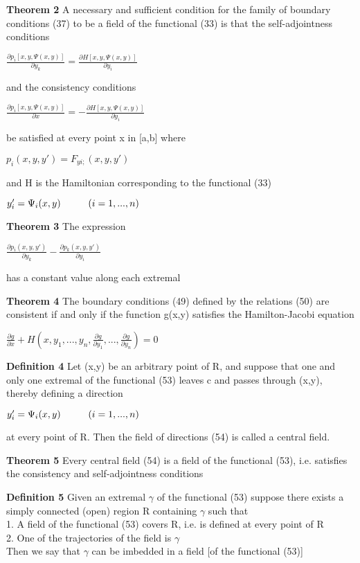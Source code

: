 \documentclass{article}
\newcommand\tab[1][1cm]{\hspace*{#1}}
\begin{document}
\textbf {Theorem 2} A necessary and sufficient condition for the family of boundary conditions (37) to be a field of the functional (33) is that the self-adjointness conditions
\begin{center}
$\frac{\partial p_i [x,y, \Psi(x,y)]}{\partial y_k} = \frac{\partial H[x,y, \Psi(x,y)]}{\partial y_i}$
\end{center}
and the consistency conditions
\begin{center}
$\frac{\partial p_i [x,y, \Psi(x,y)]}{\partial x} = - \frac{\partial H [x,y,\Psi(x,y)]}{\partial y_i}$
\end{center}
be satisfied at every point x in [a,b] where
\begin{center}
$p_i(x,y,y') = F_{yi;}(x,y,y')$
\end{center}
and H is the Hamiltonian corresponding to the functional (33)
\begin{center}
$y'_i = \Psi_i(x,y) \tab (i = 1,...,n)$
\end{center}

\textbf {Theorem 3} The expression 
\begin{center}
$\frac{\partial p_i(x,y,y')}{\partial y_k} - \frac{\partial p_k (x,y,y')}{\partial y_i}$
\end{center}
has a constant value along each extremal

\textbf {Theorem 4} The boundary conditions (49) defined by the relations (50) are consistent if and only if the function g(x,y) satisfies the Hamilton-Jacobi equation
\begin{center}
$\frac{\partial g}{\partial x} + H( x, y_1 ,..., y_n, \frac{\partial g}{\partial y_1} ,..., \frac{\partial g}{\partial y_n} ) = 0$
\end{center}

\textbf {Definition 4} Let (x,y) be an arbitrary point of R, and suppose that one and only one extremal of the functional (53) leaves c and passes through (x,y), thereby defining a direction
\begin{center}
$y'_i = \Psi_i(x,y) \tab (i = 1,...,n)$
\end{center}
at every point of R. Then the field of directions (54) is called a central field.

\textbf {Theorem 5} Every central field (54) is a field of the functional (53), i.e. satisfies the consistency and self-adjointness conditions

\textbf {Definition 5} Given an extremal $\gamma$ of the functional (53) suppose there exists a simply connected (open) region R containing $\gamma$ such that \\
1. A field of the functional (53) covers R, i.e. is defined at every point of R \\
2. One of the trajectories of the field is $\gamma$ \\
Then we say that $\gamma$ can be imbedded in a field [of the functional (53)]
\end{document}

